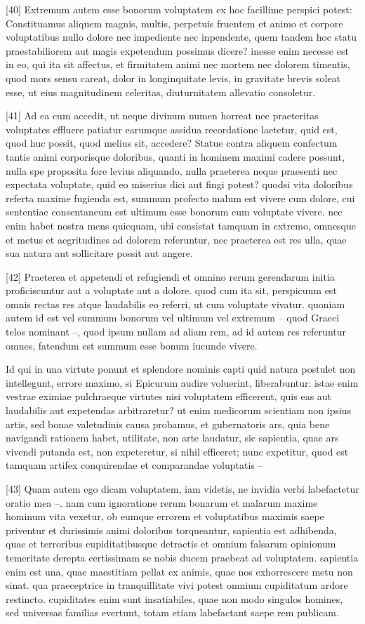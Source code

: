 \documentclass{article}
\begin{document}
[40] Extremum autem esse bonorum voluptatem ex hoc facillime perspici potest: Constituamus aliquem magnis, multis, perpetuis fruentem et animo et corpore voluptatibus nullo dolore nec impediente nec inpendente, quem tandem hoc statu praestabiliorem aut magis expetendum possimus dicere? inesse enim necesse est in eo, qui ita sit affectus, et firmitatem animi nec mortem nec dolorem timentis, quod mors sensu careat, dolor in longinquitate levis, in gravitate brevis soleat esse, ut eius magnitudinem celeritas, diuturnitatem allevatio consoletur.

[41] Ad ea cum accedit, ut neque divinum numen horreat nec praeteritas voluptates effluere patiatur earumque assidua recordatione laetetur, quid est, quod huc possit, quod melius sit, accedere? Statue contra aliquem confectum tantis animi corporisque doloribus, quanti in hominem maximi cadere possunt, nulla spe proposita fore levius aliquando, nulla praeterea neque praesenti nec expectata voluptate, quid eo miserius dici aut fingi potest? quodsi vita doloribus referta maxime fugienda est, summum profecto malum est vivere cum dolore, cui sententiae consentaneum est ultimum esse bonorum eum voluptate vivere. nec enim habet nostra mens quicquam, ubi consistat tamquam in extremo, omnesque et metus et aegritudines ad dolorem referuntur, nec praeterea est res ulla, quae sua natura aut sollicitare possit aut angere.

[42] Praeterea et appetendi et refugiendi et omnino rerum gerendarum initia proficiscuntur aut a voluptate aut a dolore. quod cum ita sit, perspicuum est omnis rectas res atque laudabilis eo referri, ut cum voluptate vivatur. quoniam autem id est vel summum bonorum vel ultimum vel extremum -- quod Graeci telos nominant --, quod ipsum nullam ad aliam rem, ad id autem res referuntur omnes, fatendum est summum esse bonum iucunde vivere.

Id qui in una virtute ponunt et splendore nominis capti quid natura postulet non intellegunt, errore maximo, si Epicurum audire voluerint, liberabuntur: istae enim vestrae eximiae pulchraeque virtutes nisi voluptatem efficerent, quis eas aut laudabilis aut expetendas arbitraretur? ut enim medicorum scientiam non ipsius artis, sed bonae valetudinis causa probamus, et gubernatoris ars, quia bene navigandi rationem habet, utilitate, non arte laudatur, sic sapientia, quae ars vivendi putanda est, non expeteretur, si nihil efficeret; nunc expetitur, quod est tamquam artifex conquirendae et comparandae voluptatis --

[43] Quam autem ego dicam voluptatem, iam videtis, ne invidia verbi labefactetur oratio mea --. nam cum ignoratione rerum bonarum et malarum maxime hominum vita vexetur, ob eumque errorem et voluptatibus maximis saepe priventur et durissimis animi doloribus torqueantur, sapientia est adhibenda, quae et terroribus cupiditatibusque detractis et omnium falsarum opinionum temeritate derepta certissimam se nobis ducem praebeat ad voluptatem. sapientia enim est una, quae maestitiam pellat ex animis, quae nos exhorrescere metu non sinat. qua praeceptrice in tranquillitate vivi potest omnium cupiditatum ardore restincto. cupiditates enim sunt insatiabiles, quae non modo singulos homines, sed universas familias evertunt, totam etiam labefactant saepe rem publicam.
\end{document}
